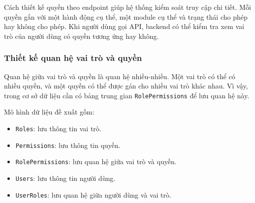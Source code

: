 Cách thiết kế quyền theo endpoint giúp hệ thống kiểm soát truy cập chi tiết. Mỗi quyền gắn với một hành động cụ thể, một module cụ thể và trạng thái cho phép hay không cho phép. Khi người dùng gọi API, backend có thể kiểm tra xem vai trò của người dùng có quyền tương ứng hay không.

\subsubsection{Thiết kế quan hệ vai trò và quyền}

Quan hệ giữa vai trò và quyền là quan hệ nhiều-nhiều. Một vai trò có thể có nhiều quyền, và một quyền có thể được gán cho nhiều vai trò khác nhau. Vì vậy, trong cơ sở dữ liệu cần có bảng trung gian \texttt{RolePermissions} để lưu quan hệ này.

Mô hình dữ liệu đề xuất gồm:

\begin{itemize}
    \item \texttt{Roles}: lưu thông tin vai trò.
    \item \texttt{Permissions}: lưu thông tin quyền.
    \item \texttt{RolePermissions}: lưu quan hệ giữa vai trò và quyền.
    \item \texttt{Users}: lưu thông tin người dùng.
    \item \texttt{UserRoles}: lưu quan hệ giữa người dùng và vai trò.
\end{itemize}
